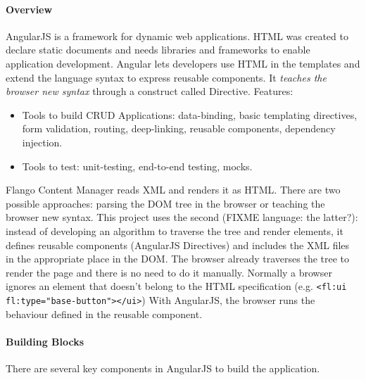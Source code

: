 \paragraph{Overview} AngularJS is a framework for dynamic web applications.
\ac{HTML} was created to declare static documents and needs libraries and frameworks to enable application development.
Angular lets developers use \ac{HTML} in the templates and extend the language syntax to express reusable components.
It \textit{teaches the browser new syntax} through a construct called Directive.
Features:
\begin{itemize}
    \item Tools to build \ac{CRUD} Applications: data-binding, basic templating directives, form validation, routing, deep-linking, reusable components, dependency injection.
    \item Tools to test: unit-testing, end-to-end testing, mocks.
\end{itemize}

Flango Content Manager reads \ac{XML} and renders it as \ac{HTML}.
There are two possible approaches: parsing the \ac{DOM} tree in the browser or teaching the browser new syntax.
This project uses the second (FIXME language: the latter?): instead of developing an algorithm to traverse the tree and render elements, it defines reusable components (AngularJS Directives) and includes the \ac{XML} files in the appropriate place in the \ac{DOM}. 
The browser already traverses the tree to render the page and there is no need to do it manually.
Normally a browser ignores an element that doesn't belong to the \ac{HTML} specification (e.g. \lstinline$<fl:ui fl:type="base-button"></ui>$)
With AngularJS, the browser runs the behaviour defined in the reusable component.

\paragraph{Building Blocks} There are several key components in AngularJS to build the application.

